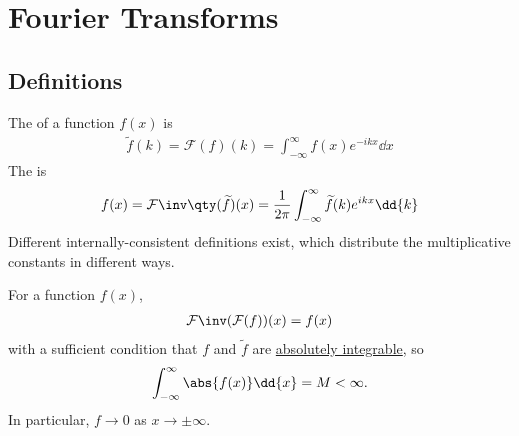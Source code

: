 \section{Fourier Transforms}

\subsection{Definitions}
\begin{definition}
	The  of a function $f(x)$ is
	\begin{align} \label{eq:8.1}
		\widetilde f(k) = \mathcal F(f)(k) = \int_{-\infty}^\infty f(x) e^{-ikx} \dd{x}
	\end{align}
	The  is
	\begin{align} \label{eq:8.2}
		f(x) = \mathcal F\inv\qty(\widetilde f)(x) = \frac{1}{2\pi} \int_{-\infty}^\infty \widetilde f(k) e^{ikx} \dd{k}
	\end{align}
	Different internally-consistent definitions exist, which distribute the multiplicative constants in different ways.
\end{definition}

\begin{theorem}
	For a function $f(x)$,
	\begin{align} \label{eq:8.3}
		\mathcal F\inv (\mathcal F (f))(x) = f(x)
	\end{align}
	with a sufficient condition that $f$ and $\widetilde f$ are \underline{absolutely integrable}, so
	\begin{align*}
		\int_{-\infty}^\infty \abs{f(x)} \dd{x} = M < \infty.
	\end{align*}
	In particular, $f \to 0$ as $x \to \pm \infty$.
\end{theorem}

